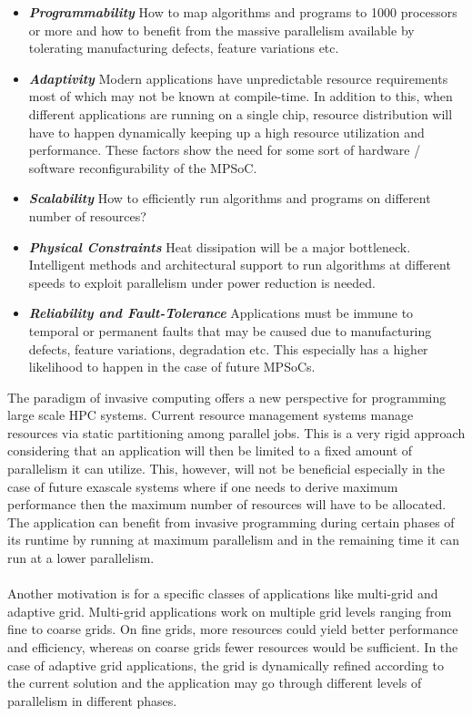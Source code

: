\begin{itemize}
\item \textbf{\textit{Programmability}} How to map algorithms and programs to 1000 processors or more and how to benefit from the massive parallelism available by tolerating manufacturing defects, feature variations etc.
\item \textbf{\textit{Adaptivity}} Modern applications have unpredictable resource requirements most of which may not be known at compile-time. In addition to this, when different applications are running on a single chip, resource distribution will have to happen dynamically keeping up a high resource utilization and performance. These factors show the need for some sort of hardware / software reconfigurability of the MPSoC.
\item \textbf{\textit{Scalability}} How to efficiently run algorithms and programs on different number of resources?
\item \textbf{\textit{Physical Constraints}} Heat dissipation will be a major bottleneck. Intelligent methods and architectural support to run algorithms at different speeds to exploit parallelism under power reduction is needed.
\item \textbf{\textit{Reliability and Fault-Tolerance}} Applications must be immune to temporal or permanent faults that may be caused due to manufacturing defects, feature variations, degradation etc. This especially has a higher likelihood to happen in the case of future MPSoCs.
\end{itemize}
The paradigm of invasive computing offers a new perspective for programming large scale HPC systems. Current resource management systems manage resources via static partitioning among parallel jobs. This is a very rigid approach considering that an application will then be limited to a fixed amount of parallelism it can utilize. This, however, will not be beneficial especially in the case of future exascale systems where if one needs to derive maximum performance then the maximum number of resources will have to be allocated. The application can benefit from invasive programming during certain phases of its runtime by running at maximum parallelism and in the remaining time it can run at a lower parallelism.\\ \\
Another motivation is for a specific classes of applications like multi-grid and adaptive grid. Multi-grid applications work on multiple grid levels ranging from fine to coarse grids. On fine grids, more resources could yield better performance and efficiency, whereas on coarse grids fewer resources would be sufficient. In the case of adaptive grid applications, the grid is dynamically refined according to the current solution and the application may go through different levels of parallelism in different phases.\\ \\
